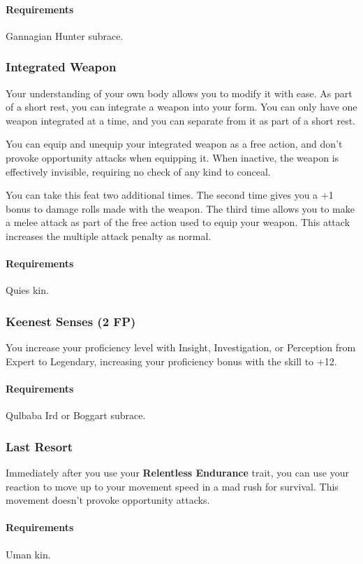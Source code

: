     \paragraph{Requirements} Gannagian Hunter subrace.
\subsubsection{Integrated Weapon} \label{feat::integratedweapon}
    Your understanding of your own body allows you to modify it with ease.
    As part of a short rest, you can integrate a weapon into your form.
    You can only have one weapon integrated at a time, and you can separate from it as part of a short rest.

    You can equip and unequip your integrated weapon as a free action, and don't provoke opportunity attacks when equipping it.
    When inactive, the weapon is effectively invisible, requiring no check of any kind to conceal.

    You can take this feat two additional times.
    The second time gives you a +1 bonus to damage rolls made with the weapon.
    The third time allows you to make a melee attack as part of the free action used to equip your weapon.
    This attack increases the multiple attack penalty as normal.
    \paragraph{Requirements} Quies kin.
\subsubsection{Keenest Senses (2 FP)} \label{feat::keenestsenses}
    You increase your proficiency level with Insight, Investigation, or Perception from Expert to Legendary, increasing your proficiency bonus with the skill to +12.
    \paragraph{Requirements} Qulbaba Ird or Boggart subrace.
\subsubsection{Last Resort} \label{feat::lastresort}
    Immediately after you use your \textbf{Relentless Endurance} trait, you can use your reaction to move up to your movement speed in a mad rush for survival.
    This movement doesn't provoke opportunity attacks.
    \paragraph{Requirements} Uman kin.

